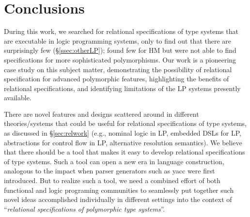 \documentclass[runningheads,a4paper]{llncs}
\begin{document}



\section{Conclusions}\label{sec:concl}\vspace*{-.5ex}
During this work, we searched for relational specifications of type systems
that are executable in logic programming systems, only to find out that there
are surprisingly few (\S\ref{ssec:otherLP}); found few for HM but were not
able to find specifications for more sophisticated polymorphisms.
Our work is a pioneering case study on this subject matter,
demonstrating the possibility of relational specification for advanced
polymorphic features, highlighting the benefits of relational specifications,
and identifying limitations of the LP systems presently available.

There are novel features and designs scattered around in different
theories/systems that could be useful for relational specifications of
type systems, as discussed in \S\ref{sec:relwork} (e.g.,
nominal logic in LP, embedded DSLs for LP, abstractions
for control flow in LP, alternative resolution semantics). We believe
that there should be a tool that makes it easy to develop relational
specifications of type systems. Such a tool can open a new era
in language construction, analogous to the impact when parser generators
such as yacc were first introduced. But to realize such a tool, we need
a combined effort of both functional and logic programing communities to
seamlessly put together such novel ideas accomplished individually
in different settings into the context of ``\emph{relational specifications
of polymorphic type systems}''.
\end{document}
